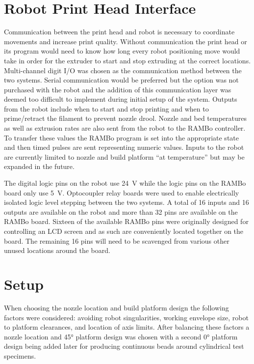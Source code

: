 \documentclass[main.tex]{subfiles}
\begin{document}
\section{Robot Print Head Interface}
\label{sec:interface}
Communication between the print head and robot is necessary to coordinate movements and increase print quality.
Without communication the print head or its program would need to know how long every robot positioning move would take in order for the extruder to start and stop extruding at the correct locations.
Multi-channel digit I/O was chosen as the communication method between the two systems.
Serial communication would be preferred but the option was not purchased with the robot and the addition of this communication layer was deemed too difficult to implement during initial setup of the system.
Outputs from the robot include when to start and stop printing and when to prime/retract the filament to prevent nozzle drool.
Nozzle and bed temperatures as well as extrusion rates are also sent from the robot to the RAMBo controller.
To transfer these values the RAMBo program is set into the appropriate state and then timed pulses are sent representing numeric values.
Inputs to the robot are currently limited to nozzle and build platform ``at temperature'' but may be expanded in the future.


The digital logic pins on the robot use \SI{24}{\volt} while the logic pins on the RAMBo board only use \SI{5}{\volt}.
Optocoupler relay boards were used to enable electrically isolated logic level stepping between the two systems.
A total of 16 inputs and 16 outputs are available on the robot and more than 32 pins are available on the RAMBo board.
Sixteen of the available RAMBo pins were originally designed for controlling an LCD screen and as such are conveniently located together on the board.
The remaining 16 pins will need to be scavenged from various other unused locations around the board.

\section{Setup}
When choosing the nozzle location and build platform design the following factors were considered:
avoiding robot singularities,
working envelope size,
robot to platform clearances,
and location of axis limits.
After balancing these factors a nozzle location and \ang{45} platform design was chosen with a second \ang{0} platform design being added later for producing continuous beads around cylindrical test specimens.
\end{document}
